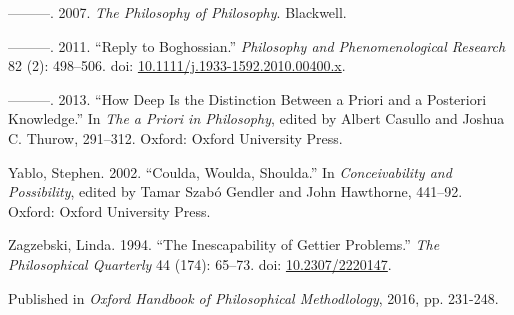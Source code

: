 \documentclass[
  10pt,
  letterpaper,
  DIV=11,
  numbers=noendperiod,
  twoside]{scrartcl}
\newlength{\cslhangindent}
\newenvironment{CSLReferences}[2] %
 {\begin{list}{}{%
  \setlength{\itemindent}{0pt}
  \setlength{\leftmargin}{0pt}
  \setlength{\parsep}{0pt}
  \ifodd #1
   \setlength{\leftmargin}{\cslhangindent}
   \setlength{\itemindent}{-1\cslhangindent}
  \fi
  \setlength{\itemsep}{#2\baselineskip}}}
 {\end{list}}
\begin{document}
\begin{CSLReferences}{1}{0}
---------. 2007. \emph{{The Philosophy of Philosophy}}. Blackwell.

---------. 2011. {``Reply to Boghossian.''} \emph{Philosophy and
Phenomenological Research} 82 (2): 498--506. doi:
\href{https://doi.org/10.1111/j.1933-1592.2010.00400.x}{10.1111/j.1933-1592.2010.00400.x}.

---------. 2013. {``How Deep Is the Distinction Between a Priori and a
Posteriori Knowledge.''} In \emph{The a Priori in Philosophy}, edited by
Albert Casullo and Joshua C. Thurow, 291--312. Oxford: Oxford University
Press.

Yablo, Stephen. 2002. {``Coulda, Woulda, Shoulda.''} In
\emph{Conceivability and Possibility}, edited by Tamar Szabó Gendler and
John Hawthorne, 441--92. Oxford: Oxford University Press.

Zagzebski, Linda. 1994. {``The Inescapability of Gettier Problems.''}
\emph{The Philosophical Quarterly} 44 (174): 65--73. doi:
\href{https://doi.org/10.2307/2220147}{10.2307/2220147}.

\end{CSLReferences}



\noindent Published in\emph{
Oxford Handbook of Philosophical Methodlology}, 2016, pp. 231-248.
\end{document}
